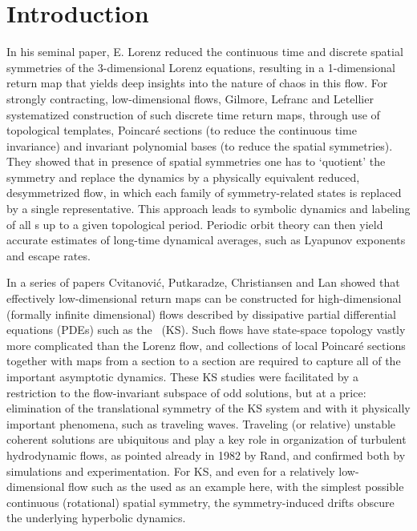 \documentclass[preprint,number,sort&compress]{elsarticle}
\begin{document}
\section{\label{s:intro} Introduction}

In his seminal paper, E. Lorenz reduced the
continuous time and discrete spatial symmetries of the
3-dimensional Lorenz equations, resulting in a 1-dimensional
return map that yields deep insights into the
nature of chaos in this flow. For strongly contracting,
low-dimensional flows, Gilmore, Lefranc and
Letellier systematized construction
of such discrete time return maps, through use of topological
templates, Poincar\'e sections (to reduce the continuous time
invariance) and in\-vari\-ant polynomial bases (to reduce the
spatial symmetries). They showed that in presence of spatial
symmetries one has to  `quotient' the symmetry and replace
the dynamics by a physically equivalent reduced,
desymmetrized flow, in which each family of symmetry-related
states is replaced by a single representative. This approach
leads to symbolic dynamics and labeling of all \po s up to a
given topological period. Periodic orbit theory can then
yield accurate estimates of long-time dynamical averages,
such as Lyapunov exponents and escape rates.

In a series of papers Cvitanovi\'{c}, Putkaradze,
Christiansen and Lan%
showed that effectively low-dimensional return maps can be
constructed for high-dimensional (formally infinite
dimensional)  flows described by dissipative partial
differential equations (PDEs) such as the \KSe\ (KS). Such
flows have state-space topology vastly more complicated than
the Lorenz flow, and collections of local Poincar\'e sections
together with maps from a section to a section are required
to capture all of the important asymptotic dynamics. These KS
studies were facilitated by a restriction to the
flow-in\-vari\-ant subspace of odd solutions, but at a price:
elimination of the translational symmetry of the KS system
and with it physically important phenomena, such as traveling
waves. Traveling (or relative) unstable coherent solutions
are ubiquitous and play a key role in organization of
turbulent hydrodynamic flows, as pointed already in
1982 by Rand, and confirmed both by
simulations and
experimentation.
For KS, and even for a relatively
low-dimensional flow such as the
\cLe{} used as an example here, with
the simplest possible continuous (rotational) spatial
symmetry, the symmetry-induced drifts obscure the underlying
hyperbolic dynamics.
\end{document}
